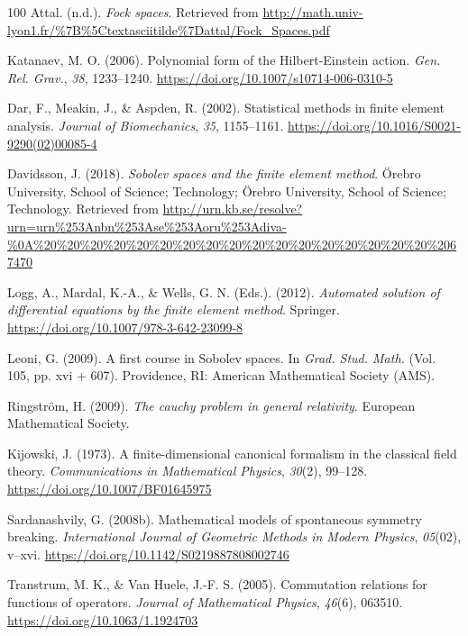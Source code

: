 \documentclass[11pt]{book}
\begin{document}
\begin{thebibliography}{100}
 Attal. (n.d.). \emph{Fock spaces}. Retrieved from
\url{http://math.univ-lyon1.fr/\%7B\%5Ctextasciitilde\%7Dattal/Fock_Spaces.pdf}

 Katanaev, M. O. (2006). Polynomial form of the Hilbert-Einstein action.
\emph{Gen. Rel. Grav.}, \emph{38}, 1233--1240.
\url{https://doi.org/10.1007/s10714-006-0310-5}

 Dar, F., Meakin, J., \& Aspden, R. (2002). Statistical methods in finite
element analysis. \emph{Journal of Biomechanics}, \emph{35}, 1155--1161.
\url{https://doi.org/10.1016/S0021-9290(02)00085-4}

 Davidsson, J. (2018). \emph{Sobolev spaces and the finite element
method}. Örebro University, School of Science; Technology; Örebro
University, School of Science; Technology. Retrieved from
\url{http://urn.kb.se/resolve?urn=urn\%253Anbn\%253Ase\%253Aoru\%253Adiva-\%0A\%20\%20\%20\%20\%20\%20\%20\%20\%20\%20\%20\%20\%20\%20\%20\%20\%20\%2067470}

 Logg, A., Mardal, K.-A., \& Wells, G. N. (Eds.). (2012). \emph{Automated
solution of differential equations by the finite element method}.
Springer. \url{https://doi.org/10.1007/978-3-642-23099-8}

 Leoni, G. (2009). A first course in Sobolev spaces. In \emph{Grad. Stud.
Math.} (Vol. 105, pp. xvi + 607). Providence, RI: American Mathematical
Society (AMS).

 Ringström, H. (2009). \emph{The cauchy problem in general relativity}.
European Mathematical Society.

 Kijowski, J. (1973). A finite-dimensional canonical formalism in the
classical field theory. \emph{Communications in Mathematical Physics},
\emph{30}(2), 99--128. \url{https://doi.org/10.1007/BF01645975}

 Sardanashvily, G. (2008b). Mathematical models of spontaneous symmetry
breaking. \emph{International Journal of Geometric Methods in Modern
Physics}, \emph{05}(02), v--xvi.
\url{https://doi.org/10.1142/S0219887808002746}

 Transtrum, M. K., \& Van Huele, J.-F. S. (2005). Commutation relations
for functions of operators. \emph{Journal of Mathematical Physics},
\emph{46}(6), 063510. \url{https://doi.org/10.1063/1.1924703}


\end{thebibliography}
\end{document}
